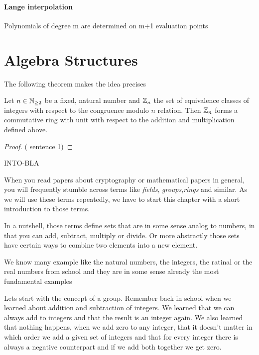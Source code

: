 \paragraph{Lange interpolation}
Polynomials of degree m are determined on m+1 evaluation points 

\section{Algebra Structures}

The following theorem makes the idea precises
\begin{theorem}
\label{def: residual class ring}
Let $ n \in \mathbb{N} _{\geq 2} $ be a fixed, natural number and
$ \mathbb{Z}_n $ the set of equivalence classes of integers with respect to the  congruence modulo $ n $ relation. Then $ \mathbb{Z}_n $ forms a commutative ring with unit with respect to the addition and multiplication defined above.
\end{theorem}
\begin{proof} (\cite{AL} sentence 1)  
\end{proof}
INTO-BLA

When you read papers about cryptography or mathematical papers in general, you will frequently stumble across terms like \textit{fields}, \textit{groups},\textit{rings} and similar. As we will use these terms repeatedly, we have to start this chapter with a short introduction to those terms.

In a nutshell, those terms define sets that are in some sense analog to numbers, in that you can add, subtract, multiply or divide. Or more abstractly those sets have certain ways to combine two elements into a new element.

We know many example like the natural numbers, the integers, the ratinal or the real numbers from school and they are in some sense already the most fundamental examples

Lets start with the concept of a group. Remember back in school when we learned about addition and subtraction of integers. We learned that we can always add to integers and that the result is an integer again. We also learned that nothing happens, when we add zero to any integer, that it doesn't matter in which order we add a given set of integers and that for every integer there is always a negative counterpart and if we add both together we get zero. 

